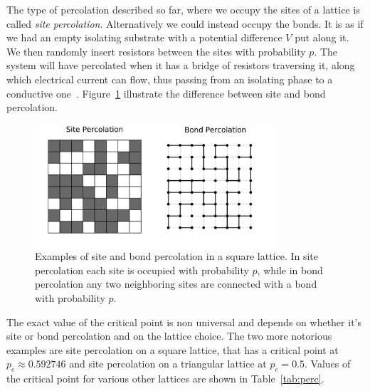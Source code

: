 The type of percolation described so far, where we occupy the sites of a lattice
is called \textit{site percolation}. Alternatively we could instead occupy the
bonds. It is as if we had an empty isolating substrate with a potential
difference $V$ put along it. We then randomly insert resistors between the
sites with probability $p$. The system will have percolated when it has a
bridge of resistors traversing it, along which electrical current can flow,
thus passing from an isolating phase to a conductive one~\cite{Kirkpatrick1973}.
Figure~\ref{fig:sitebond} illustrate the difference between site and bond
percolation.

\begin{figure}[b]
\begin{center}
    \includegraphics[width=0.8\textwidth]{chapters/ch2-crit/figs/sitebond}
\end{center}
\caption{Examples of site and bond percolation in a square lattice.
    In site percolation each site is occupied with probability $p$, while
    in bond percolation any two neighboring sites are connected with a bond
    with probability $p$.}
\label{fig:sitebond}
\end{figure}

The exact value of the critical point is non universal and depends on whether
it's site or bond percolation and on the lattice choice. The two more notorious
examples are site percolation on a square lattice, that has a critical point at
$p_c\approx0.592746$ and site percolation on a triangular lattice at $p_c=0.5$.
Values of the critical point for various other lattices are shown in
Table~\ref{tab:perc}.

